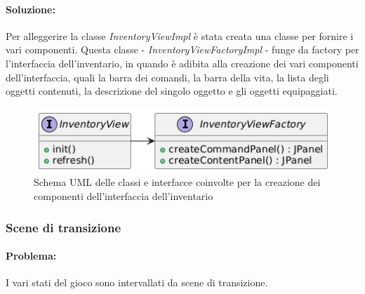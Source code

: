 \documentclass[a4paper,12pt]{report}
\begin{document}
\paragraph{Soluzione:} Per alleggerire la classe \textit{InventoryViewImpl} è stata creata una classe per fornire i vari componenti. Questa classe - \textit{InventoryViewFactoryImpl} -
funge da factory per l'interfaccia dell'inventario, in quando è adibita alla creazione dei vari componenti dell'interfaccia, quali la barra dei comandi, la barra della vita,
la lista degli oggetti contenuti, la descrizione del singolo oggetto e gli oggetti equipaggiati.
\begin{figure}[H]
	\centering{}
	\includegraphics[width=\textwidth]{img/lorenzo/inventory-factory.png}
	\caption{Schema UML delle classi e interfacce coinvolte per la creazione dei componenti dell'interfaccia dell'inventario}
	\label{img:template}
\end{figure}

\subsubsection{Scene di transizione}
\paragraph{Problema:} I vari stati del gioco sono intervallati da scene di transizione. 
\end{document}
